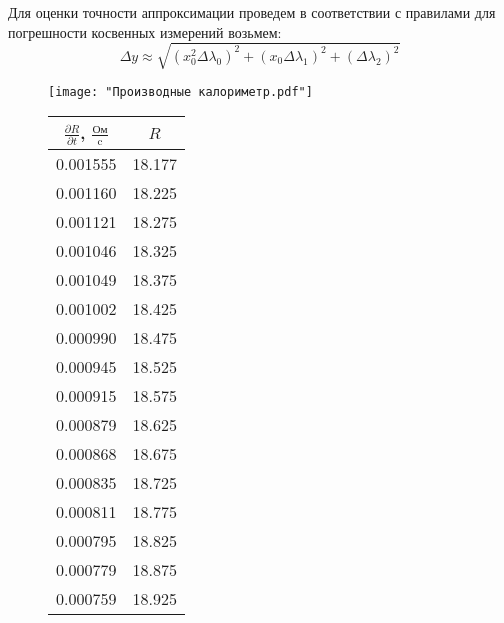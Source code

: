 \documentclass[12pt,a4paper]{article}
\begin{document}
Для оценки точности аппроксимации проведем в соответствии с правилами для погрешности косвенных измерений возьмем: 
$$\Delta y \approx \sqrt{\left(x_0^2\Delta\lambda_0\right)^2+\left(x_0\Delta\lambda_1\right)^2+\left(\Delta\lambda_2\right)^2}$$
\begin{figure}\CenterFloatBoxes
	\begin{floatrow}
		{
			
			\texttt{[image: "Производные калориметр.pdf"]}
			
		}
		\killfloatstyle{}
		{	\footnotesize
			\begin{tabular}{|c|c|}
				
				\hline
				$\frac{\partial R}{\partial t}$, $\frac{\text{Ом}}{\text{c}}$ &        $R$ \text{Ом}\\ \hline
				0.001555 & 18.177 \\ \hline
				0.001160 & 18.225 \\ \hline
				0.001121 & 18.275 \\ \hline
				0.001046 & 18.325 \\ \hline
				0.001049 & 18.375 \\ \hline
				0.001002 & 18.425 \\ \hline
				0.000990 & 18.475 \\ \hline
				0.000945 & 18.525 \\ \hline
				0.000915 & 18.575 \\ \hline
				0.000879 & 18.625 \\ \hline
				0.000868 & 18.675 \\ \hline
				0.000835 & 18.725 \\ \hline
				0.000811 & 18.775 \\ \hline
				0.000795 & 18.825 \\ \hline
				0.000779 & 18.875 \\ \hline
				0.000759 & 18.925 \\ \hline
			\end{tabular}
			
		}
	\end{floatrow}
\end{figure}
\end{document}
